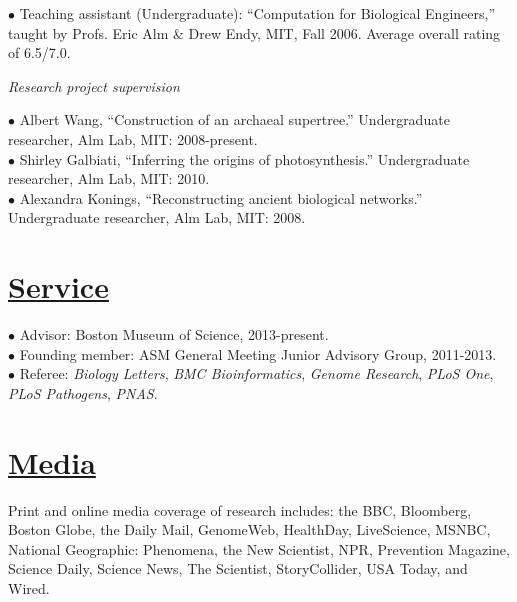\documentclass[overlapped,line,11pt]{res}
\begin{document}
\begin{resume}
\vspace{-10mm}
\hangindent=0.5in $\bullet$\hspace{.1in} Teaching assistant
(Undergraduate): ``Computation for Biological Engineers,''
taught by Profs. Eric Alm \& Drew Endy, MIT, Fall 2006.  Average overall rating
  of 6.5/7.0.

\emph{Research project supervision}

\hangindent=0.5in $\bullet$\hspace{.1in} Albert Wang, ``Construction
of an archaeal supertree.''  Undergraduate researcher, Alm Lab, MIT:
2008-present.\\

\vspace{-10mm} \hangindent=0.5in $\bullet$\hspace{.1in} Shirley
Galbiati, ``Inferring the origins of photosynthesis.''
Undergraduate researcher, Alm Lab, MIT: 2010.\\

\vspace{-10mm} 
\hangindent=0.5in $\bullet$\hspace{.1in} Alexandra
Konings, ``Reconstructing ancient
biological networks.''  Undergraduate researcher, Alm Lab, MIT: 2008.

\section{\underline{\sc Service}}
\vspace{.25in}

\hangindent=0.5in $\bullet$\hspace{.1in} Advisor: Boston Museum of Science, 2013-present. \\

\vspace{-10mm}
\hangindent=0.5in $\bullet$\hspace{.1in} Founding member: ASM General Meeting
Junior Advisory Group, 2011-2013. \\

\vspace{-10mm} \hangindent=0.5in $\bullet$\hspace{.1in} Referee:
\emph{Biology Letters}, \emph{BMC Bioinformatics}, \emph{Genome
  Research}, \emph{PLoS One}, \emph{PLoS Pathogens}, \emph{PNAS}.


\section{\underline{\sc Media}} 
\vspace{.25in} Print and online media coverage of research includes:
the BBC, Bloomberg, Boston Globe, the Daily Mail, GenomeWeb,
HealthDay, LiveScience, MSNBC, National Geographic: Phenomena, the New
Scientist, NPR, Prevention Magazine, Science Daily, Science News, The
Scientist, StoryCollider, USA Today, and Wired.


\end{resume}
\end{document}
